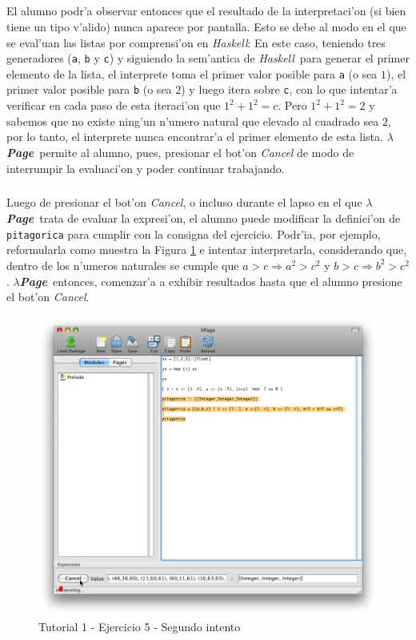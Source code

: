 \documentclass[a4paper]{article}
\newcommand{\haskell}{\textsl{Haskell}}
\newcommand{\hpage}{\textbf{\textsl{$\lambda$Page}}}
\begin{document}
\subparagraph{}El alumno podr'a observar entonces que el resultado de la interpretaci'on (si bien tiene un tipo v'alido) nunca aparece por pantalla.  Esto se debe al modo en el que se eval'uan las listas por comprensi'on en \haskell: En este caso, teniendo tres generadores (\texttt{a}, \texttt{b} y \texttt{c}) y siguiendo la sem'antica de \haskell\, para generar el primer elemento de la lista, el interprete toma el primer valor posible para \texttt{a} (o sea $1$), el primer valor posible para \texttt{b} (o sea $2$) y luego itera sobre \texttt{c}, con lo que intentar'a verificar en cada paso de esta iteraci'on que $1^{2} + 1^{2} = c$.  Pero $1^{2}+1^{2} = 2$ y sabemos que no existe ning'un n'umero natural que elevado al cuadrado sea $2$, por lo tanto, el interprete nunca encontrar'a el primer elemento de esta lista.  \hpage\ permite al alumno, pues, presionar el bot'on \textsl{Cancel} de modo de interrumpir la evaluaci'on y poder continuar trabajando.
\subparagraph{}Luego de presionar el bot'on \textsl{Cancel}, o incluso durante el lapso en el que \hpage\ trata de evaluar la expresi'on, el alumno puede modificar la definici'on de \texttt{pitagorica} para cumplir con la consigna del ejercicio.  Podr'ia, por ejemplo, reformularla como muestra la Figura \ref{tut104} e intentar interpretarla, considerando que, dentro de los n'umeros naturales se cumple que $a > c \Rightarrow a^{2} > c^{2}$ y $b > c \Rightarrow b^{2} > c^{2}$.  \hpage\ entonces, comenzar'a a exhibir resultados hasta que el alumno presione el bot'on \textsl{Cancel}.
\begin{figure}[hp]
	\begin{center}
        	\includegraphics[width=.75\textwidth]{pictures/tut1/04}
		\caption{Tutorial 1 - Ejercicio 5 - Segundo intento}
		\label{tut104}
	\end{center}
\end{figure}
\end{document}

